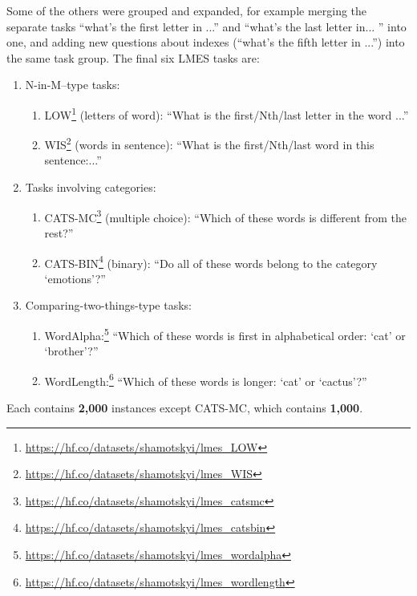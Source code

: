 Some of the others were grouped and expanded, for example merging the separate tasks ``what's the first letter in ...'' and ``what's the last letter in... '' into one, and adding new questions about indexes (``what's the fifth letter in ...'') into the same task group.
The final six LMES tasks are:
\begin{enumerate}
    \tightlist
    \item N-in-M–type tasks: 
    \begin{enumerate}
        \item LOW\footnote{\href{https://hf.co/datasets/shamotskyi/lmes_LOW}{https://hf.co/datasets/shamotskyi/lmes\_LOW}} (letters of word): ``What is the first/Nth/last letter in the word ...''
        \item WIS\footnote{\href{https://hf.co/datasets/shamotskyi/lmes_WIS}{https://hf.co/datasets/shamotskyi/lmes\_WIS}} (words in sentence): ``What is the first/Nth/last word in this sentence:...''
    \end{enumerate}
    \item Tasks involving categories: 
    \begin{enumerate}
        \item CATS-MC\footnote{\href{https://hf.co/datasets/shamotskyi/lmes_catsmc}{https://hf.co/datasets/shamotskyi/lmes\_catsmc}} (multiple choice): ``Which of these words is different from the rest?''
        \item CATS-BIN\footnote{\href{https://hf.co/datasets/shamotskyi/lmes_catsbin}{https://hf.co/datasets/shamotskyi/lmes\_catsbin}} (binary): ``Do all of these words belong to the category `emotions'?''
    \end{enumerate}
    \item Comparing-two-things-type tasks: 
    \begin{enumerate}
        \item WordAlpha:\footnote{\href{https://hf.co/datasets/shamotskyi/lmes_wordalpha}{https://hf.co/datasets/shamotskyi/lmes\_wordalpha}} 
        ``Which of these words is first in alphabetical order: `cat' or `brother'?''
        \item WordLength:\footnote{\href{https://hf.co/datasets/shamotskyi/lmes_wordlength}{https://hf.co/datasets/shamotskyi/lmes\_wordlength}} ``Which of these words is longer: `cat' or `cactus'?''
    \end{enumerate}
\end{enumerate}

Each contains \textbf{2,000} instances except CATS-MC, which contains \textbf{1,000}.


